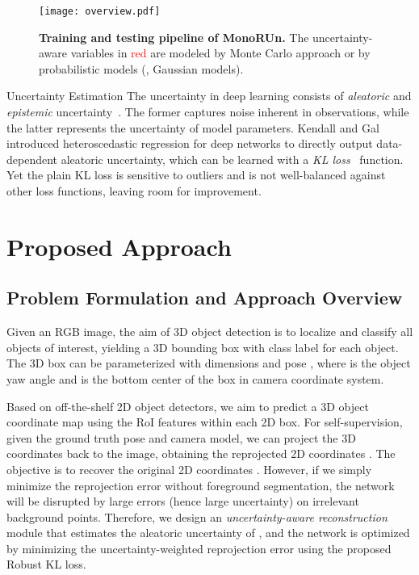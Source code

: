 \documentclass[10pt,twocolumn,letterpaper]{article}
\makeatletter
\renewcommand{\paragraph}{
  \@startsection{paragraph}{4}
  {\z@}{0.7ex \@plus .2ex \@minus .1ex}{-1em}
  {\normalfont\normalsize\bfseries}
}
\makeatother
\begin{document}
\begin{figure*}[t]
   \begin{center}
   \texttt{[image: overview.pdf]}
   \end{center}
   \vspace{-2mm}
   \caption{\textbf{Training and testing pipeline of MonoRUn.} The uncertainty-aware variables in \textcolor{red}{red} are modeled by Monte Carlo approach or by probabilistic models (\eg, Gaussian models).} 
\label{fig:overview}
\end{figure*}

\paragraph{Uncertainty Estimation} 
The uncertainty in deep learning consists of \textit{aleatoric} and \textit{epistemic} uncertainty~\cite{kendall2017uncertainties}. The former captures noise inherent in observations, while the latter represents the uncertainty of model parameters.
Kendall and Gal~\cite{kendall2017uncertainties} introduced heteroscedastic regression for deep networks to directly output data-dependent aleatoric uncertainty, which can be learned with a \textit{KL loss}~\cite{klloss, kendall2017uncertainties} function. Yet the plain KL loss is sensitive to outliers and is not well-balanced against other loss functions, leaving room for improvement.

\section{Proposed Approach}
\subsection{Problem Formulation and Approach Overview}
Given an RGB image, the aim of 3D object detection is to localize and classify all objects of interest, yielding a 3D bounding box with class label for each object. The 3D box can be parameterized with dimensions  and pose , where  is the object yaw angle and  is the bottom center of the box in camera coordinate system.

Based on off-the-shelf 2D object detectors, we aim to predict a 3D object coordinate map using the RoI features within each 2D box. For self-supervision, given the ground truth pose  and camera model, we can project the 3D coordinates back to the image, obtaining the reprojected 2D coordinates . The objective is to recover the original 2D coordinates . However, if we simply minimize the reprojection error without foreground segmentation, the network will be disrupted by large errors (hence large uncertainty) on irrelevant background points. Therefore, we design an \textit{uncertainty-aware reconstruction} module that estimates the aleatoric uncertainty of , and the network is optimized by minimizing the uncertainty-weighted reprojection error using the proposed Robust KL loss.
\end{document}
